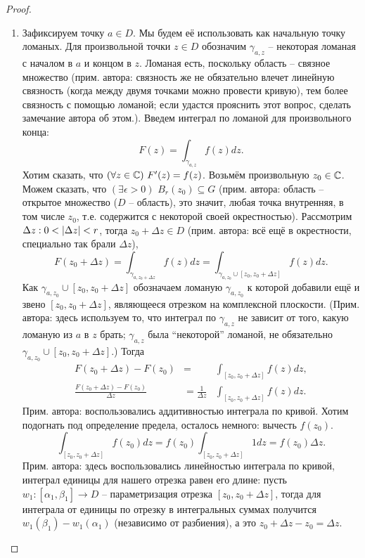 \begin{proof}
\begin{enumerate}
		\item Зафиксируем точку $a \in D$. Мы будем её использовать как начальную точку ломаных. Для произвольной точки $z \in D$ обозначим $\gamma_{a, z}$ -- некоторая ломаная с началом в $a$ и концом в $z$. Ломаная есть, поскольку область -- связное множество {\color{red} (прим. автора: связность же не обязательно влечет линейную связность (когда между двумя точками можно провести кривую), тем более связность с помощью ломаной; если удастся прояснить этот вопрос, сделать замечание автора об этом.)}. Введем интеграл по ломаной для произвольного конца:
		\[
			F(z) = \int_{\gamma_{a,z}} f(z) dz.
		\]
		Хотим сказать, что $(\forall z \in \mathbb{C}) \,\, F'(z) = f(z)$. Возьмём произвольную $z_0 \in \mathbb{C}$. Можем сказать, что $(\exists \epsilon > 0) \,\, B_r(z_0) \subseteq G$ (прим. автора: область -- открытое множество ($D$ -- область), это значит, любая точка внутренняя, в том числе $z_0$, т.е. содержится с некоторой своей окрестностью). Рассмотрим $\Delta z: 0 < \mathopen{}\left\lvert\Delta z\right\rvert\mathclose{} < r$, тогда $z_0 + \Delta z \in D$ (прим. автора: всё ещё в окрестности, специально так брали $\Delta z$),
		\[
			F(z_0 + \Delta z) = \int_{\gamma_{a,z_0 + \Delta z}} f(z) dz = \int_{\gamma_{a, z_0} \cup [z_0, z_0 + \Delta z]} f(z) dz.
		\]
		Как $\gamma_{a, z_0} \cup [z_0, z_0 + \Delta z]$ обозначаем ломаную $\gamma_{a, z_0}$ к которой добавили ещё и звено $[z_0, z_0 + \Delta z]$, являющееся отрезком на комплексной плоскости. (Прим. автора: здесь используем то, что интеграл по $\gamma_{a, z}$ не зависит от того, какую ломаную из $a$ в $z$ брать; $\gamma_{a, z}$ была ``некоторой'' ломаной, не обязательно $\gamma_{a, z_0} \cup [z_0, z_0 + \Delta z]$.)
		Тогда
		\[
			\begin{aligned}
				F(z_0 + \Delta z) - F(z_0) & = & \int_{[z_0, z_0 + \Delta z]} f(z) dz, \\
				\frac{F(z_0 + \Delta z) - F(z_0)}{\Delta z} & = \frac{1}{\Delta z} & \int_{[z_0, z_0 + \Delta z]} f(z) dz.
			\end{aligned}
		\]
		Прим. автора: воспользовались аддитивностью интеграла по кривой.
		Хотим подогнать под определение предела, осталось немного: вычесть $f(z_0)$.
		\[
			\int_{[z_0, z_0 + \Delta z]} f(z_0) dz = f(z_0) \int_{[z_0, z_0 + \Delta z]} 1 dz = f(z_0) \Delta z.
		\]
		Прим. автора: здесь воспользовались линейностью интеграла по кривой, интеграл единицы для нашего отрезка равен его длине: пусть $w_1: [\alpha_1, \beta_1] \to D$ -- параметризация отрезка $[z_0, z_0 + \Delta z]$, тогда для интеграла от единицы по отрезку в интегральных суммах получится $w_1(\beta_1) - w_1(\alpha_1)$ (независимо от разбиения), а это $z_0 + \Delta z - z_0 = \Delta z$.

\end{enumerate}
\end{proof}
